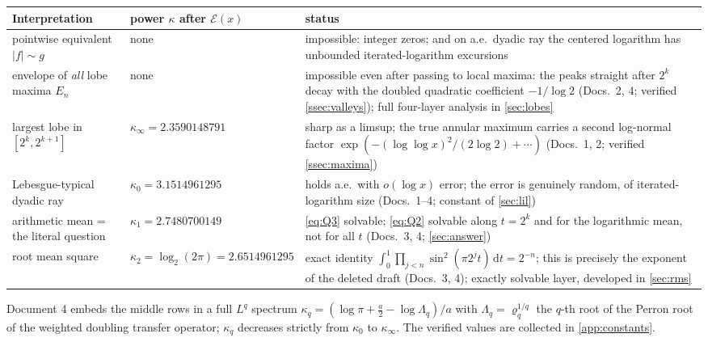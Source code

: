 \documentclass[11pt,oneside]{article}
\theoremstyle{definition}
\theoremstyle{remark}
\newcommand{\dd}{\,\mathrm d}
\newcommand{\smallo}{o}
\begin{document}
\begin{center}
\small
\begin{tabularx}{\textwidth}{@{}>{\raggedright\arraybackslash}p{}
 >{\centering\arraybackslash}p{}X@{}}
\toprule
Interpretation & power $\kappa$ after $\mathcal E(x)$ & status \\
\midrule
pointwise equivalent $|f|\sim g$
 & none
 & impossible: integer zeros; and on a.e.\ dyadic ray the centered logarithm
   has unbounded iterated-logarithm excursions \\[0.35em]
envelope of \emph{all} lobe maxima $E_n$
 & none
 & impossible even after passing to local maxima: the peaks straight after
   $2^k$ decay with the doubled quadratic coefficient $-1/\log2$
   (Docs.~2, 4; verified \cref{ssec:valleys}); full four-layer analysis
   in \cref{sec:lobes} \\[0.35em]
largest lobe in $[2^k,2^{k+1}]$
 & $\kappa_\infty=2.3590148791$
 & sharp as a limsup; the true annular maximum carries a second log-normal
   factor $\exp(-(\log\log x)^2/(2\log2)+\cdots)$ (Docs.~1, 2; verified
   \cref{ssec:maxima}) \\[0.35em]
Lebesgue-typical dyadic ray
 & $\kappa_0=3.1514961295$
 & holds a.e.\ with $\smallo(\log x)$ error; the error is genuinely random,
   of iterated-logarithm size (Docs.~1--4; constant of \cref{sec:lil}) \\[0.35em]
arithmetic mean = the literal question
 & $\kappa_1=2.7480700149$
 & \eqref{eq:Q3} solvable; \eqref{eq:Q2} solvable along $t=2^k$ and for the
   logarithmic mean, not for all $t$ (Docs.~3, 4; \cref{sec:answer}) \\[0.35em]
root mean square
 & $\kappa_2=\log_2(2\pi)=2.6514961295$
 & exact identity $\int_0^1\prod_{j<n}\sin^2(\pi2^jt)\dd t=2^{-n}$; this is
   precisely the exponent of the deleted draft (Docs.~3, 4); exactly
   solvable layer, developed in \cref{sec:rms} \\
\bottomrule
\end{tabularx}
\end{center}

Document 4 embeds the middle rows in a full $L^q$ spectrum
$\kappa_q=(\log\pi+\tfrac a2-\log\Lambda_q)/a$ with
$\Lambda_q=\varrho_q^{1/q}$ the $q$-th root of the Perron root of the
weighted doubling transfer operator; $\kappa_q$ decreases strictly from
$\kappa_0$ to $\kappa_\infty$.  The verified values are collected in
\cref{app:constants}.
\end{document}
